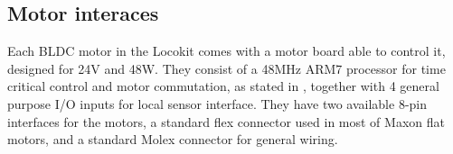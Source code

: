 
\subsection{Motor interaces} %
\label{sub:motor_interaces}
Each BLDC motor in the Locokit comes with a motor board able to control it, designed for 24V and 48W.
They consist of a 48MHz ARM7 processor for time critical control and motor commutation, as stated in \cite{locokit-electronics}, together with 4 general purpose I/O inputs for local sensor interface.
They have two available 8-pin interfaces for the motors, a standard flex connector used in most of Maxon flat motors, and a standard Molex connector for general wiring.




